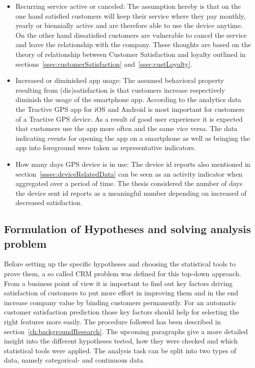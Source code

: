 \begin{itemize}
	\item Recurring service active or canceled: The assumption hereby is that on the one hand satisfied customers will keep their service where they pay monthly, yearly or biennially active and are therefore able to use the device anytime. On the other hand dissatisfied customers are vulnerable to cancel the service and leave the relationship with the company. These thoughts are based on the theory of relationship between Customer Satisfaction and loyalty outlined in sections~\ref{ssec:customerSatisfaction} and~\ref{ssec:custLoyalty}.
	\item Increased or diminished app usage: The assumed behavioral property resulting from (dis)satisfaction is that customers increase respectively diminish the usage of the smartphone app. According to the analytics data the Tractive GPS app for iOS and Android is most important for customers of a Tractive GPS device. As a result of good user experience it is expected that customers use the app more often and the same vice versa. The data indicating events for opening the app on a smartphone as well as bringing the app into foreground were taken as representative indicators.
	\item How many days GPS device is in use: The device id reports also mentioned in section~\ref{sssec:deviceRelatedData} can be seen as an activity indicator when aggregated over a period of time. The thesis considered the number of days the device sent id reports as a meaningful number depending on increased of decreased satisfaction.
\end{itemize}

\subsection{Formulation of Hypotheses and solving analysis problem}
Before setting up the specific hypotheses and choosing the statistical tools to prove them, a so called CRM problem was defined for this top-down approach. From a business point of view it is important to find out key factors driving satisfaction of customers to put more effort in improving them and in the end increase company value by binding customers permanently. For an automatic customer satisfaction prediction those key factors should help for selecting the right features more easily. The procedure followed has been described in section~\ref{ch:backgroundResearch}. The upcoming paragraphs give a more detailed insight into the different hypotheses tested, how they were checked and which statistical tools were applied. The analysis task can be split into two types of data, namely categorical- and continuous data.

